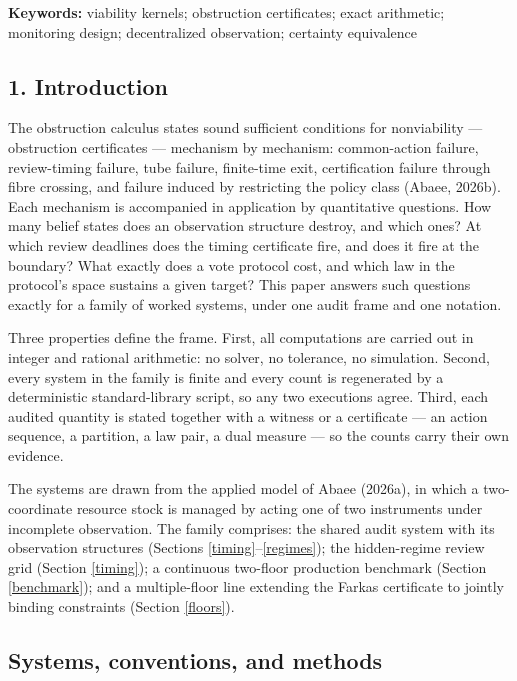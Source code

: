 \documentclass[10pt,twocolumn]{article}
\theoremstyle{definition}
\begin{document}
\textbf{Keywords:} viability kernels; obstruction certificates; exact
arithmetic; monitoring design; decentralized observation; certainty
equivalence

\subsection{1. Introduction}\label{introduction}

The obstruction calculus states sound sufficient conditions for
nonviability --- obstruction certificates --- mechanism by mechanism:
common-action failure, review-timing failure, tube failure, finite-time
exit, certification failure through fibre crossing, and failure induced
by restricting the policy class (Abaee, 2026b). Each mechanism is
accompanied in application by quantitative questions. How many belief
states does an observation structure destroy, and which ones? At which
review deadlines does the timing certificate fire, and does it fire at
the boundary? What exactly does a vote protocol cost, and which law in
the protocol's space sustains a given target? This paper answers such
questions exactly for a family of worked systems, under one audit frame
and one notation.

Three properties define the frame. First, all computations are carried
out in integer and rational arithmetic: no solver, no tolerance, no
simulation. Second, every system in the family is finite and every count
is regenerated by a deterministic standard-library script, so any two
executions agree. Third, each audited quantity is stated together with a
witness or a certificate --- an action sequence, a partition, a law
pair, a dual measure --- so the counts carry their own evidence.

The systems are drawn from the applied model of Abaee (2026a), in which
a two-coordinate resource stock is managed by acting one of two
instruments under incomplete observation. The family comprises: the
shared audit system with its observation structures (Sections
\ref{timing}--\ref{regimes}); the hidden-regime review grid (Section
\ref{timing}); a continuous two-floor production benchmark (Section
\ref{benchmark}); and a multiple-floor line extending the Farkas
certificate to jointly binding constraints (Section \ref{floors}).

\subsection{Systems, conventions, and methods}\label{frame}
\end{document}
